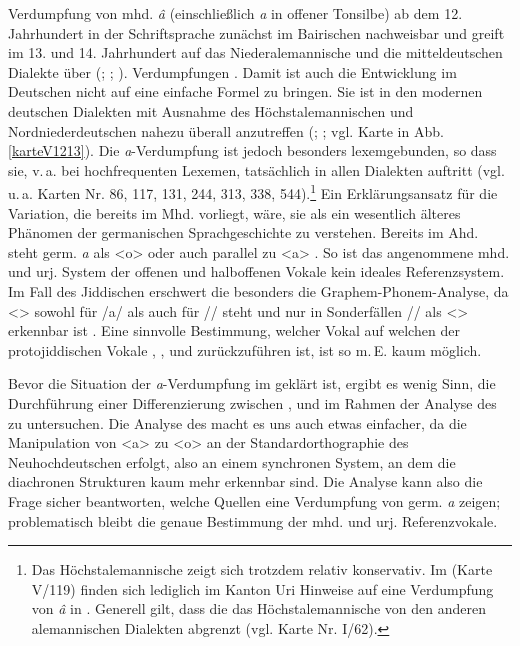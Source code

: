 Verdumpfung von mhd. \textit{â} (einschließlich \textit{a} in offener Tonsilbe) ab dem 12. Jahrhundert in der Schriftsprache zunächst im Bairischen nachweisbar und greift im 13. und 14. Jahrhundert auf das Niederalemannische und die mitteldeutschen Dialekte  über (\cite[212]{Schirmunski1962}; \cite[§48]{Paul2007}; \cite[§L14]{Ebert1993}). Verdumpfungen  \parencite[§48]{Paul2007}. Damit ist  auch die Entwicklung im Deutschen nicht auf eine einfache Formel zu bringen. Sie ist in den modernen deutschen Dialekten mit Ausnahme des Höchstalemannischen und Nordniederdeutschen nahezu überall anzutreffen (\cite[212]{Schirmunski1962}; \cite[§L14]{Ebert1993}; vgl. Karte in Abb. \ref{karteV1213}). Die \textit{a}-Verdumpfung ist jedoch besonders lexemgebunden, so dass sie, v.\,a. bei hochfrequenten Lexemen, tatsächlich in allen Dialekten auftritt (vgl. u.\,a. Karten Nr. 86, 117, 131, 244, 313, 338, 544).\footnote{Das Höchstalemannische zeigt sich trotzdem relativ konservativ. Im  (Karte V/119) finden sich lediglich im Kanton Uri Hinweise auf eine Verdumpfung von \textit{â} in . Generell gilt, dass die  das Höchstalemannische von den anderen alemannischen Dialekten abgrenzt (vgl.  Karte Nr. I/62).} Ein Erklärungsansatz für die Variation, die bereits im Mhd. vorliegt, wäre, sie als ein wesentlich älteres Phänomen der germanischen Sprachgeschichte zu verstehen. Bereits im Ahd. steht germ. \textit{a} als <o> oder auch parallel zu <a> \parencite[§ 25]{BrauneReiffenstein2004}. So ist das angenommene mhd. und urj. System der offenen und halboffenen Vokale kein ideales Referenzsystem. Im Fall des Jiddischen erschwert die  besonders die Graphem-Phonem-Analyse, da <> sowohl für /a/ als auch für /\textopeno/ steht und nur in Sonderfällen /\textopeno/ als <> 
erkennbar ist \parencite[93–121]{Timm1987}. Eine sinnvolle Bestimmung, welcher Vokal auf welchen der protojiddischen Vokale , ,  und  zurückzuführen ist, ist so m.\,E. kaum möglich. 


Bevor die Situation der \textit{a}-Verdumpfung im  geklärt ist, ergibt es wenig Sinn, die Durchführung einer Differenzierung zwischen ,  und  im Rahmen der Analyse des  zu untersuchen. Die Analyse des  macht es uns auch etwas einfacher, da die Manipulation von <a> zu <o> an der Standardorthographie des Neuhochdeutschen erfolgt, also an einem synchronen System, an dem die diachronen Strukturen kaum mehr erkennbar sind. Die Analyse kann also die Frage sicher beantworten, welche Quellen eine Verdumpfung von germ. \textit{a} zeigen; problematisch bleibt die genaue Bestimmung der mhd. und urj. Referenzvokale. 


